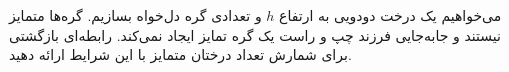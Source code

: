 \EXERCISE
می‌خواهیم یک درخت دودویی به ارتفاع
$h$
و تعدادی گره دل‌خواه بسازیم. گره‌ها متمایز نیستند و جابه‌جایی فرزند چپ و راست یک گره تمایز ایجاد نمی‌کند. رابطه‌ای بازگشتی برای شمارش تعداد درختان متمایز با این شرایط ارائه دهید.